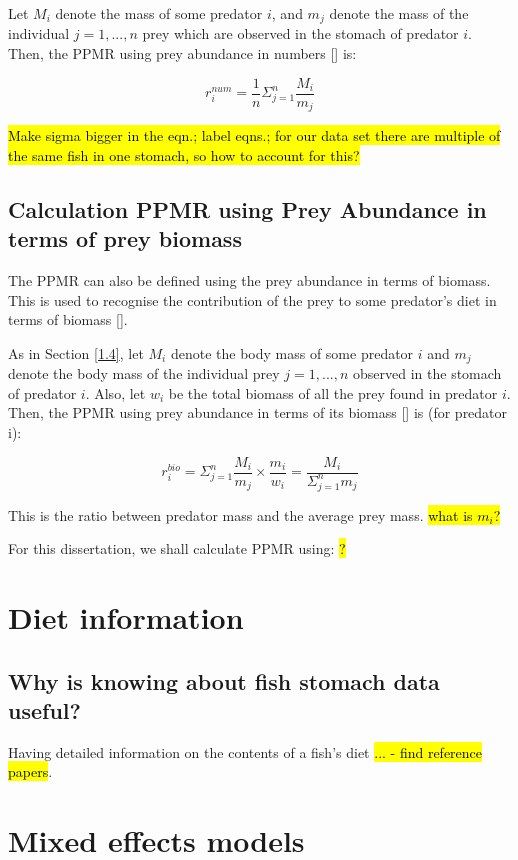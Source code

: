 \documentclass{article}
\begin{document}
Let $M_i$ denote the mass of some predator $i$, and $m_j$ denote the mass of the individual $j = 1, . . . , n$ prey which are observed in the stomach of predator $i$.
Then, the PPMR using prey abundance in numbers [\cite{Reum19}] is:

$$ r^{num}_{i} = \frac{1}{n} \Sigma^{n}_{j=1} \frac{M_i}{m_j} $$

\hl{Make sigma bigger in the eqn.; label eqns.; for our data set there are multiple of the same fish in one stomach, so how to account for this?}

\subsection{Calculation PPMR using Prey Abundance in terms of prey biomass}

The PPMR can also be defined using the prey abundance in terms of biomass. This is used to recognise the contribution of the prey to some predator's diet in terms of biomass [\cite{Reum19}].

As in Section \ref{1.4}, let $M_{i}$ denote the body mass of some predator $i$ and $m_{j}$ denote the body mass of the individual prey $j = 1, . . . , n$ observed in the stomach of predator $i$. Also, let $w_{i}$ be the total biomass of all the prey found in predator $i$. Then, the PPMR using prey abundance in terms of its biomass [\cite{Reum19}] is (for predator i):

$$r^{bio}_{i} = \Sigma_{j=1}^{n} \frac{M_{i}}{m_{j}} \times \frac{m_{i}}{w_{i}} = \frac{M_{i}}{\Sigma_{j=1}^{n} m_{j}}$$

This is the ratio between predator mass and the average prey mass.
\hl{what is $m_{i}$?}

For this dissertation, we shall calculate PPMR using: \hl{?}

\section{Diet information}

\subsection{Why is knowing about fish stomach data useful?}

Having detailed information on the contents of a fish's diet \hl{... - find reference papers}.

\section{Mixed effects models}
\end{document}
